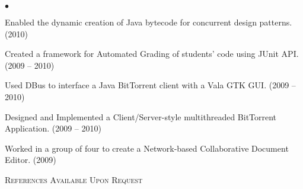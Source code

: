 \documentclass{article}
\newcommand{\lineunder} {
	\vspace*{-8pt} \\ \hspace*{-18pt} \hrulefill \\
}
\newcommand{\header}[1] {
	{\hspace*{-15pt}\vspace*{6pt} \textsc{#1}} \vspace*{-6pt} \lineunder
}
\newenvironment{achievements} {
	\begin{list}{$\bullet$}
		{\topsep 0pt \itemsep -2pt}
	}{
		\vspace*{4pt}\end{list}
	}
\begin{document}
	\begin{achievements}
		\item{Enabled the dynamic creation of Java bytecode for concurrent design patterns. (2010)}
		\item{Created a framework for Automated Grading of students' code using JUnit API. (2009 -- 2010)}
		\item{Used DBus to interface a Java BitTorrent client with a Vala GTK GUI. (2009 -- 2010)}
		\item{Designed and Implemented a Client/Server-style multithreaded BitTorrent Application. (2009 -- 2010)}
		\item{Worked in a group of four to create a Network-based Collaborative Document Editor. (2009)}
	\end{achievements}

\header{References Available Upon Request}
\end{document}
